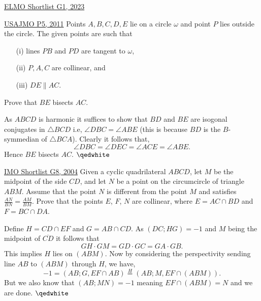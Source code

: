 \begin{problem}{14}{\href{https://artofproblemsolving.com/community/c6h3100572p28033718}{ELMO Shortlist G1, 2023}}
\begin{problem}{12}{\href{https://artofproblemsolving.com/community/q1h404355p35105708}{USAJMO P5, 2011}} 
	Points $A,B,C,D,E$ lie on a circle $\omega$ and point $P$ lies outside the circle. The given points are such that 
	\begin{itemize}
		\item [(i)] lines $PB$ and $PD$ are tangent to $\omega$,
		\item [(ii)] $P, A, C$ are collinear, and 
		\item[(iii)] $DE \parallel AC$.
	\end{itemize}
	Prove that $BE$ bisects $AC$.
	\begin{solution} As $ABCD$ is harmonic it suffices to show that $BD$ and $BE$ are isogonal conjugates in $\triangle BCD$ i.e, $\angle DBC=\angle ABE$ (this is because $BD$ is the $B$-symmedian of $\triangle BCA$). Clearly it follows that,
$$\angle DBC=\angle DEC=\angle ACE=\angle ABE.$$Hence $BE$ bisects $AC$. $\qedwhite$
	\end{solution}
\end{problem}

\begin{problem}{13}{\href{https://artofproblemsolving.com/community/c6h39093p243438}{IMO Shortlist G8, 2004}} 
	Given a cyclic quadrilateral $ABCD$, let $M$ be the midpoint of the side $CD$, and let $N$ be a point on the circumcircle of triangle $ABM$. Assume that the point $N$ is different from the point $M$ and satisfies $\frac{AN}{BN}=\frac{AM}{BM}$. Prove that the points $E$, $F$, $N$ are collinear, where $E=AC\cap BD$ and $F=BC\cap DA$.
	\begin{solution} Define $H=CD\cap EF$ and $G=AB\cap CD$. As $(DC; HG)=-1$ and $M$ being the midpoint of $\overline{CD}$ it follows that 
	$$GH\cdot GM=GD\cdot GC=GA\cdot GB.$$
	This implies $H$ lies on $(ABM)$. Now by considering the perspectivity sending line $AB$ to $(ABM)$ through $H$, we have,
	$$-1=(AB; G, EF\cap AB)\overset{H}{=}(AB; M, EF\cap (ABM)).$$
	But we also know that $(AB; MN)=-1$ meaning $EF\cap (ABM)=N$ and we are done. $\qedwhite$
	\end{solution}
\end{problem}


\end{problem}
